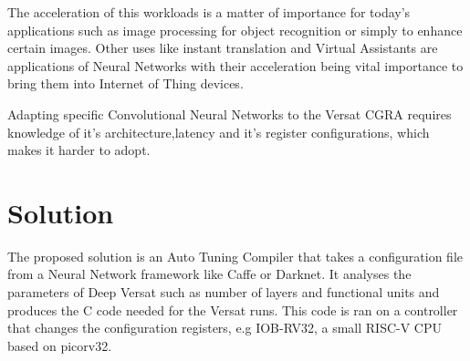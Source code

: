 The acceleration of this workloads is a matter of importance for today's applications such as image processing for object recognition or 
simply to enhance certain images. Other uses like instant translation and Virtual Assistants are applications of Neural Networks with their acceleration
being vital importance to bring them into Internet of Thing devices.

Adapting specific Convolutional Neural Networks to the Versat CGRA requires knowledge of it's architecture,latency and it's register configurations,
which makes it harder to adopt.







\section{Solution}
\label{section:solution}

The proposed solution is an Auto Tuning Compiler that takes a configuration file from a Neural Network framework
like Caffe or Darknet. %
 It analyses the parameters of Deep Versat such as number
 of layers and functional units and produces the C code needed for the Versat runs.
 This code is ran on a controller that changes the configuration registers, e.g IOB-RV32, a small RISC-V
CPU based on picorv32. %



